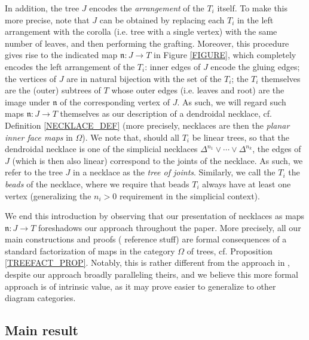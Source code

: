 \documentclass[a4paper,10pt
,draft
]{article}%
\numberwithin{equation}{section}
\numberwithin{figure}{section}
\theoremstyle{definition} %
\newcommand{\1}{\ensuremath{\mathbbm 1}}%
\begin{document}
In addition, the tree $J$ encodes the \emph{arrangement}
of the $T_i$ itself. 
To make this more precise,
note that $J$ can be obtained by replacing each $T_i$ 
in the left arrangement with the corolla (i.e. tree with a single vertex) with the same number of leaves,
and then performing the grafting.
Moreover, this procedure gives rise to the indicated map
$\mathfrak{n} \colon J \to T$
in Figure \ref{FIGURE},
which completely encodes the left arrangement of the $T_i$: 
inner edges of $J$ encode the gluing edges;
the vertices of $J$ are in natural bijection with the set of the $T_i$; the $T_i$ themselves are the (outer) subtrees of $T$ whose outer edges (i.e. leaves and root)
are the image under $\mathfrak{n}$
of the corresponding vertex of $J$.
As such, we will regard such maps 
$\mathfrak{n} \colon J \to T$ themselves 
as our description of a dendroidal necklace,
cf. Definition \ref{NECKLACE_DEF}
(more precisely, necklaces are then the 
\emph{planar inner face maps} in $\Omega$).
We note that, should all $T_i$ be linear trees, so that the dendroidal necklace is one of the simplicial necklaces
$\Delta^{n_1} \vee \cdots \vee \Delta^{n_k}$,
the edges of $J$ (which is then also linear) correspond to the joints of the necklace. 
As such, we refer to the tree $J$ in a necklace as the 
\emph{tree of joints}. Similarly, we call the $T_i$ the \emph{beads} of the necklace, where we require that beads $T_i$ always have at least one vertex (generalizing the $n_i>0$ requirement in the simplicial context).

We end this introduction by observing that our presentation of necklaces as maps $\mathfrak{n} \colon J \to T$
foreshadows our approach throughout the paper.
More precisely, all our main constructions and proofs {(\color{red} reference stuff)}
are formal consequences of a standard factorization of maps in the category $\Omega$ of trees, cf. Proposition \ref{TREEFACT_PROP}.
Notably, this is rather different from the approach in \cite{DS11},
despite our approach broadly paralleling theirs,
and we believe this more formal approach is of intrinsic value,
as it may prove easier to generalize to other diagram categories.




\subsection{Main result}
\label{MAINRESULT_SEC}
\end{document}
